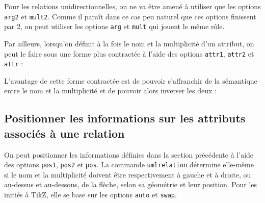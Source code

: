 \documentclass[a4paper,11pt]{report}
\newcommand{\inputTikZ}[1]{%
  }%
\newcommand{\inputTikZ}[1]{%
    \texttt{[image: fig/\#1.pdf]}%
  }%
\begin{document}
\medskip

Pour les relations unidirectionnelles, on ne va être amené à utiliser que les options {\tt arg2} et {\tt mult2}. Comme il paraît dans ce cas peu naturel que ces options finissent par 2, on peut utiliser les options {\tt arg} et {\tt mult} qui jouent le même rôle.

Par ailleurs, lorsqu'on définit à la fois le nom et la multiplicité d'un attribut, on peut le faire sous une forme plus contractée à l'aide des options {\tt attr1}, {\tt attr2} et {\tt attr} :

\medskip

\begin{minipage}{0.5\textwidth}

\end{minipage}
\begin{minipage}{0.4\textwidth}
\begin{center}
\inputTikZ{figure15}
\end{center}
\end{minipage}

\medskip

L'avantage de cette forme contractée est de pouvoir s'affranchir de la sémantique entre le nom et la multiplicité et de pouvoir alors inverser les deux :

\medskip

\begin{minipage}{0.5\textwidth}

\end{minipage}
\begin{minipage}{0.4\textwidth}
\begin{center}
\inputTikZ{figure16}
\end{center}
\end{minipage}

\medskip

\subsection{Positionner les informations sur les attributs associés à une relation}

On peut positionner les informations définies dans la section précédente à l'aide des options {\tt pos1}, {\tt pos2} et {\tt pos}.
La commande {\tt umlrelation} détermine elle-même si le nom et la multiplicité doivent être respectivement à gauche et à droite, ou au-dessus et au-dessous, de la flèche, selon sa géométrie et leur position. Pour les initiés à TikZ, elle se base sur les options {\tt auto} et {\tt swap}.
\end{document}
